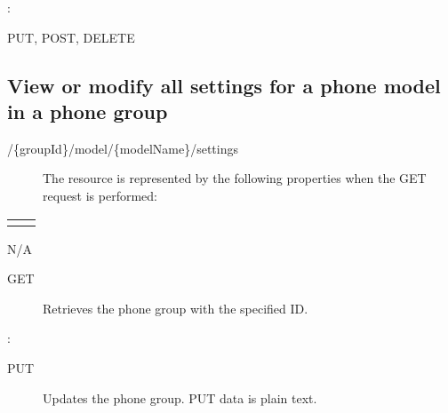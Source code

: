 \documentclass[letterpaper,10pt,english]{sphinxmanual}
\begin{document}
:

\begin{sphinxVerbatim}[commandchars=\\\{\}]
\end{sphinxVerbatim}

 PUT, POST, DELETE


\subsection{View or modify all settings for a phone model in a phone group}
\label{\detokenize{restapi:view-or-modify-all-settings-for-a-phone-model-in-a-phone-group}}
 /\{groupId\}/model/\{modelName\}/settings
\begin{description}
\item[{}] \leavevmode
The resource is represented by the following properties when the GET request is performed:

\end{description}


\begin{savenotes}\sphinxattablestart
\centering
\begin{tabulary}{\linewidth}[t]{|T|T|}
\hline

&
\\
\hline&\\
\hline
\end{tabulary}
\par
\sphinxattableend\end{savenotes}

 N/A
\begin{description}
\item[{ GET}] \leavevmode
Retrieves the phone group with the specified ID.

\end{description}

:

\begin{sphinxVerbatim}[commandchars=\\\{\}]
\end{sphinxVerbatim}
\begin{description}
\item[{ PUT}] \leavevmode
Updates the phone group. PUT data is plain text.

\end{description}
\end{document}
